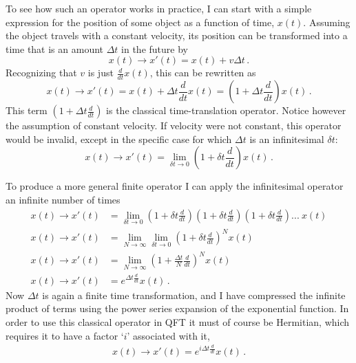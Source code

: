     To see how such an operator works in practice,
        I can start with a simple expression for the position of some object as a function of time, $x(t)$.
    Assuming the object travels with a constant velocity,
        its position can be transformed into a time that is an amount $\Delta t$ in the future by
    \begin{equation}
        x(t) \to x'(t) = x(t) + v \Delta t
        \,.
    \end{equation}
    Recognizing that $v$ is just $\frac{d}{dt} x(t)$, this can be rewritten as
    \begin{equation}
        x(t) \to x'(t) = x(t) + \Delta t \frac{d}{dt} x(t) = \left(1+\Delta t \frac{d}{dt}\right) x(t)
        \,.
    \end{equation}
    This term $\left(1+\Delta t \frac{d}{dt}\right)$ is the classical time-translation operator.
    Notice however the assumption of constant velocity.
    If velocity were not constant, this operator would be invalid,
        except in the specific case for which $\Delta t$ is an infinitesimal $\delta t$:
    \begin{equation}
        x(t) \to x'(t) = \lim_{\delta t \to 0} \left(1+\delta t \frac{d}{dt}\right) x(t)
        \,.
    \end{equation}

    To produce a more general finite operator I can apply the infinitesimal operator an infinite number of times
    \begin{equation} \begin{split}
        x(t) \to x'(t) &= \lim_{\delta t \to 0} \left(1+\delta t \frac{d}{dt}\right)\left(1+\delta t \frac{d}{dt}\right)\left(1+\delta t \frac{d}{dt}\right)...\ x(t)
        \\x(t) \to x'(t) &= \lim_{N \to \infty} \lim_{\delta t \to 0} \left(1+\delta t \frac{d}{dt}\right)^N x(t)
        \\x(t) \to x'(t) &= \lim_{N \to \infty} \left(1+\frac{\Delta t}{N} \frac{d}{dt}\right)^N x(t)
        \\x(t) \to x'(t) &= e^{\Delta t \frac{d}{dt}} x(t)
        \,.
    \end{split} \end{equation}
    Now $\Delta t$ is again a finite time transformation,
        and I have compressed the infinite product of terms using the power series expansion of the exponential function.
    In order to use this classical operator in QFT it must of course be Hermitian,
        which requires it to have a factor `$i$' associated with it,
    \begin{equation} \begin{split}
        x(t) \to x'(t) = e^{i\Delta t \frac{d}{dt}} x(t)
        \,.
    \end{split} \end{equation}

